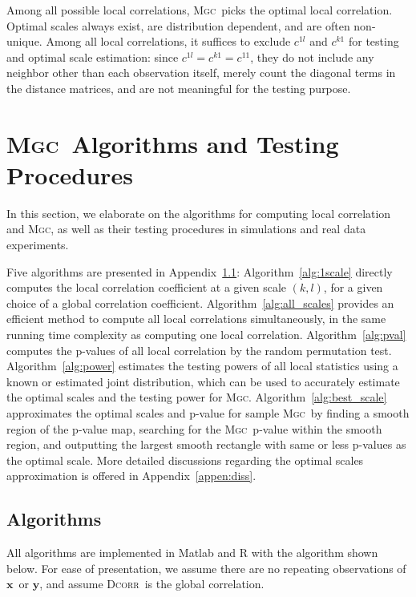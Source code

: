 \documentclass[11pt]{article}
\providecommand{\sct}[1]{{\normalfont\textsc{#1}}}
\providecommand{\mb}[1]{\boldsymbol{#1}}
\newcommand{\G}{c}
\newcommand{\Mgc}{\sct{Mgc}}
\newcommand{\Dcorr}{\sct{Dcorr}}
\newcommand{\mbx}{\ensuremath{\mb{x}}}
\newcommand{\mby}{\ensuremath{\mb{y}}}
\begin{document}
Among all possible local correlations, \Mgc~picks the optimal local correlation. Optimal scales always exist,  are distribution dependent, and are often non-unique. Among all local correlations, it suffices to exclude $\G^{1l}$ and $\G^{k1}$ for testing and optimal scale estimation: since $\G^{1l}=\G^{k1}=\G^{11}$, they do not include any neighbor other than each observation itself, merely count the diagonal terms in the distance matrices, and are not meaningful for the testing purpose.


\section{\Mgc~Algorithms and Testing Procedures}
\label{appen:tests}
In this section, we elaborate on the algorithms for computing local correlation and \Mgc, as well as their testing procedures in simulations and real data experiments.

Five algorithms are presented in Appendix~\ref{appen:algorithms}: Algorithm~\ref{alg:1scale} directly computes the local correlation coefficient at a given scale $(k,l)$, for a given choice of a global correlation coefficient.
Algorithm~\ref{alg:all_scales} provides an efficient method to compute all local correlations simultaneously, in the same running time complexity as computing one local correlation. Algorithm~\ref{alg:pval} computes the p-values of all local correlation by the random permutation test. 
Algorithm~\ref{alg:power} estimates the testing powers of all local statistics using a known or estimated joint distribution, which can be used to accurately estimate the optimal scales and the testing power for \Mgc. 
Algorithm~\ref{alg:best_scale} approximates the optimal scales and p-value for sample \Mgc~by finding a smooth region of the p-value map, searching for the \Mgc~p-value within the smooth region, and outputting the largest smooth rectangle with same or less p-values as the optimal scale. More detailed discussions regarding the optimal scales approximation is offered in Appendix~\ref{appen:diss}.

\subsection{Algorithms}
\label{appen:algorithms}
All algorithms are implemented in Matlab and R with the algorithm shown below. For ease of presentation, we assume there are no repeating observations of \mbx~or \mby, and assume \Dcorr~is the global correlation.
\end{document}
